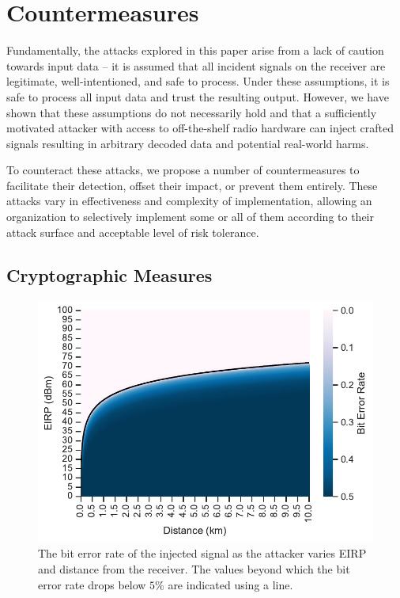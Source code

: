 \section{Countermeasures}\label{sec:countermeasures}


Fundamentally, the attacks explored in this paper arise from a lack of caution towards input data -- it is assumed that all incident signals on the receiver are legitimate, well-intentioned, and safe to process.
Under these assumptions, it is safe to process all input data and trust the resulting output.
However, we have shown that these assumptions do not necessarily hold and that a sufficiently motivated attacker with access to off-the-shelf radio hardware can inject crafted signals resulting in arbitrary decoded data and potential real-world harms.

To counteract these attacks, we propose a number of countermeasures to facilitate their detection, offset their impact, or prevent them entirely.
These attacks vary in effectiveness and complexity of implementation, allowing an organization to selectively implement some or all of them according to their attack surface and acceptable level of risk tolerance.


\subsection{Cryptographic Measures}

\begin{figure}
    \centering
    \includegraphics[width=\columnwidth]{diagrams/distance_eirp_heatmap_95.pdf}
    \caption{The bit error rate of the injected signal as the attacker varies EIRP and distance from the receiver. The values beyond which the bit error rate drops below $5$\% are indicated using a line.}
    \label{fig:distance_eirp}
\end{figure}

